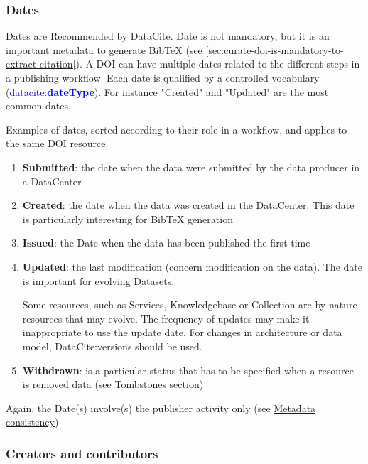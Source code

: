 \documentclass[11pt,a4paper]{ivoa}
\newcommand{\dataciteterm}[1]{\textcolor{blue}{\mbox{datacite:\textbf{#1}}}}
\begin{document}
\subsubsection{Dates}\hypertarget{dates}{}\label{sec:dates}

Dates are Recommended by DataCite. Date is not mandatory, but it is an important metadata  to generate BibTeX (see \ref{sec:curate-doi-is-mandatory-to-extract-citation}).\newline
A DOI can have multiple dates related to the different steps in a publishing workflow. Each date is qualified by a controlled vocabulary  (\dataciteterm{dateType}). For instance "Created" and "Updated" are the most common dates.

Examples of dates, sorted according to their role in a workflow, and applies to the same DOI resource

\begin{enumerate}
\item \textbf{Submitted}: the date when the data were submitted by the data producer in a DataCenter

\item \textbf{Created}: the date when the data was created in the DataCenter. This date is particularly interesting for BibTeX generation

\item \textbf{Issued}: the Date when the data has been published the first time

\item \textbf{Updated}: the last modification (concern modification on the data). The date is important for evolving Datasets.

   Some resources, such as Services, Knowledgebase or Collection are by nature resources that may evolve. The frequency of updates may make it inappropriate to use the update date. For changes in architecture or data model, DataCite:versions should be used.
   
\item \textbf{Withdrawn}: is a particular status that has to be specified when a resource is removed data (see \hyperlink{tombstones}{Tombstones} section)

\end{enumerate}

Again, the Date(s) involve(s) the publisher activity only (see \hyperlink{metadata-consistency}{Metadata consistency})

\subsubsection{Creators and contributors}\hypertarget{creators-and-contributors}{}\label{sec:creators-and-contributors}
\end{document}

